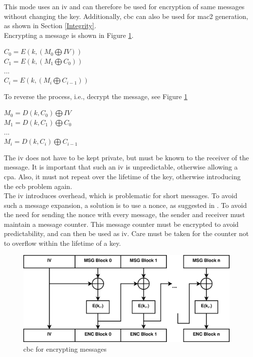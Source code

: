 This mode uses an \gls{iv} and can therefore be used for encryption of same messages without changing the key. Additionally, \gls{cbc} can also be used
for \gls{mac2} generation, as shown in Section \ref{Integrity}.
\\
Encrypting a message is shown in Figure \ref{fig:cbc_encrypt}.
\begin{center}
$ C_0 = E(k, (M_0 \bigoplus IV ) )  $
\\
$ C_1 = E(k, (M_1  \bigoplus C_0) ) $
\\
$...$
\\
$ C_i = E(k, (M_i \bigoplus C_{i-1} ) )  $
\end{center}
To reverse the process, i.e., decrypt the message, see Figure \ref{fig:cbc_encrypt}
\begin{center}
$ M_0 = D(k, C_0) \bigoplus IV $
\\
$ M_1 = D(k, C_1) \bigoplus C_0 $
\\
$...$
\\
$ M_i = D(k, C_i) \bigoplus C_{i-1} $
\end{center}
The \gls{iv} does not have to be kept private, but must be known to the receiver of the message. It is important that such an \gls{iv} is unpredictable, otherwise
allowing a \gls{cpa}. Also, it must not repeat over the lifetime of the key, otherwise introducing the \gls{ecb} problem again. 
\\
The \gls{iv} introduces overhead, which is problematic for  short messages.
To avoid such a message expansion, a solution is to use a nonce, as suggested in \cite{cryptoEng}.
To avoid the need for sending the nonce with every message, the sender and receiver must maintain a message counter. This message counter must be encrypted to avoid predictability, and can
then be used as \gls{iv}. Care must be taken for the counter not to overflow within the lifetime of a key.

\begin{figure}
    \centering
    \includegraphics[width=1\textwidth]{figures/CBCencrypt.eps}
    \caption{\gls{cbc} for encrypting messages}
    \label{fig:cbc_encrypt}
\end{figure}


